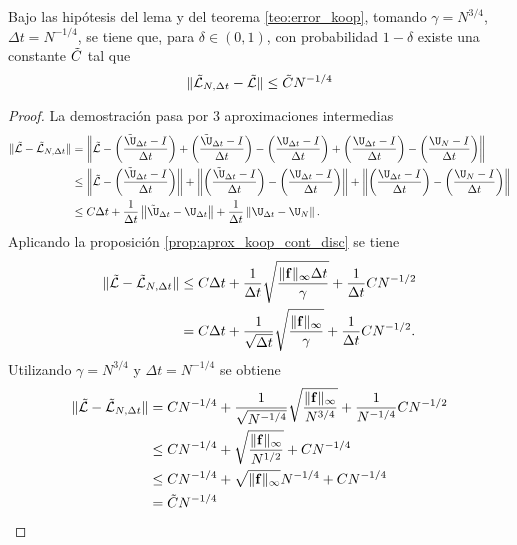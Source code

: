 \begin{prop}
    Bajo las hipótesis del lema y del teorema \ref{teo:error_koop}, tomando $\gamma = N^{3/4}$, $\Delta t = N^{-1/4}$, se tiene que, para $\delta \in (0, 1)$, con probabilidad $1-\delta$ existe una constante $\Tilde{C}$ tal que
    \[
    \| \Tilde{\mathcal{L}}_{N, \Delta t} - \Tilde{\mathcal{L}}\| \leq \Tilde{C} N^{-1/4}
    \]
\end{prop}
\begin{proof}
    La demostración pasa por 3 aproximaciones intermedias
    \[
    \begin{aligned}
        \| \Tilde{\mathcal{L}} - \Tilde{\mathcal{L}}_{N, \Delta t}\| &= \left \| \Tilde{\mathcal{L}} - \left ( \frac{\Tilde{\U}_{\Delta t} - I}{\Delta t} \right ) + \left ( \frac{\Tilde{\U}_{\Delta t} - I}{\Delta t} \right ) - \left ( \frac{\U_{\Delta t} - I}{\Delta t} \right ) + \left ( \frac{\U_{\Delta t} - I}{\Delta t} \right ) - \left ( \frac{\U_N - I}{\Delta t} \right )  \right \| \\
        &\leq \left \| \Tilde{\mathcal{L}} - \left ( \frac{\Tilde{\U}_{\Delta t} - I}{\Delta t} \right ) \right \| + \left \| \left ( \frac{\Tilde{\U}_{\Delta t} - I}{\Delta t} \right ) - \left ( \frac{\U_{\Delta t} - I}{\Delta t} \right ) \right \| + \left \| \left ( \frac{\U_{\Delta t} - I}{\Delta t} \right ) - \left ( \frac{\U_N - I}{\Delta t} \right )  \right \| \\
        & \leq C \Delta t + \frac{1}{\Delta t} \left \|  \Tilde{\U}_{\Delta t} - \U_{\Delta t}  \right \| + \frac{1}{\Delta t} \left \| \U_{\Delta t} - \U_N \right \|.
    \end{aligned}
    \]
    Aplicando la proposición \ref{prop:aprox_koop_cont_disc} se tiene
        \[
    \begin{aligned}
        \| \Tilde{\mathcal{L}} - \Tilde{\mathcal{L}}_{N, \Delta t}\|
        & \leq C \Delta t + \frac{1}{\Delta t} \sqrt{\frac{\| \mathbf{f} \|_\infty \Delta t}{\gamma}} + \frac{1}{\Delta t} C N^{-1/2} \\
        & = C \Delta t + \frac{1}{\sqrt{\Delta t}} \sqrt{\frac{\| \mathbf{f} \|_\infty}{\gamma}} + \frac{1}{\Delta t} C N^{-1/2}.
    \end{aligned}
    \]
    Utilizando $\gamma = N^{3/4}$ y $\Delta t = N^{-1/4}$ se obtiene
    \[
    \begin{aligned}
        \| \Tilde{\mathcal{L}} - \Tilde{\mathcal{L}}_{N, \Delta t}\|
        & = C N^{-1/4} + \frac{1}{\sqrt{N^{-1/4}}} \sqrt{\frac{\| \mathbf{f} \|_\infty}{N^{3/4}}} + \frac{1}{N^{-1/4}} C N^{-1/2} \\
        & \leq C N^{-1/4} + \sqrt{\frac{\| \mathbf{f} \|_\infty}{N^{1/2}}} + C N^{-1/4} \\
        & \leq C N^{-1/4} + \sqrt{\| \mathbf{f} \|_\infty} N^{-1/4} + C N^{-1/4} \\
        & = \Tilde{C} N^{-1/4}
    \end{aligned}
    \]
\end{proof}

